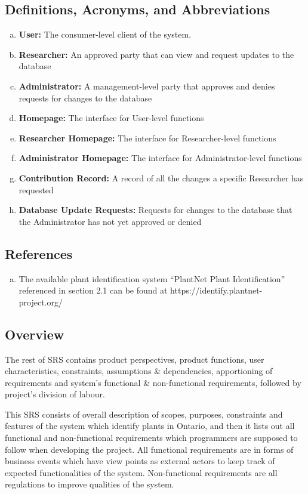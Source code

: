 \documentclass[]{article}
\begin{document}
\subsection{Definitions, Acronyms, and Abbreviations}
\label{sub:definitions_acronyms_and_abbreviations}
\begin{enumerate}[a)]
	\item \textbf{User: }The consumer-level client of the system.
	\item \textbf{Researcher: }An approved party that can view and request updates to the database
	\item \textbf{Administrator: }A management-level party that approves and denies requests for changes to the database
	\item \textbf{Homepage: }The interface for User-level functions
	\item \textbf{Researcher Homepage: }The interface for Researcher-level functions
	\item \textbf{Administrator Homepage: }The interface for Administrator-level functions
	\item \textbf{Contribution Record: }A record of all the changes a specific Researcher has requested
	\item \textbf{Database Update Requests: }Requests for changes to the database that the Administrator has not yet approved or denied
\end{enumerate}

\subsection{References}
\label{sub:references}
\begin{enumerate}[a)]
	\item The available plant identification system ``PlantNet Plant Identification'' referenced in section 2.1 can be found at https://identify.plantnet-project.org/ 
\end{enumerate}

\subsection{Overview}
\label{sub:overview}
{\color{red}
The rest of SRS contains product perspectives, product functions, user characteristics, constraints, assumptions \& dependencies, apportioning of requirements and system's functional \& non-functional requirements, followed by project's division of labour.


This SRS consists of overall description of scopes, purposes, constraints and features of the system which identify plants in Ontario, and then it lists out all functional and non-functional requirements which programmers are supposed to follow when developing the project. All functional requirements are in forms of business events which have view points as external actors to keep track of expected functionalities of the system. Non-functional requirements are all regulations to improve qualities of the system.}
\end{document}
